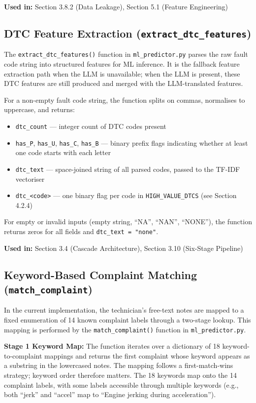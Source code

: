 \documentclass[10pt]{article}
\begin{document}
\textbf{Used in:} Section 3.8.2 (Data Leakage), Section 5.1 (Feature Engineering)

\subsection{DTC Feature Extraction (\texttt{extract\_dtc\_features})}

The \texttt{extract\_dtc\_features()} function in \texttt{ml\_predictor.py} parses the raw fault code string into structured features for ML inference. It is the fallback feature extraction path when the LLM is unavailable; when the LLM is present, these DTC features are still produced and merged with the LLM-translated features.

For a non-empty fault code string, the function splits on commas, normalises to uppercase, and returns:
\begin{itemize}
    \item \texttt{dtc\_count} --- integer count of DTC codes present
    \item \texttt{has\_P}, \texttt{has\_U}, \texttt{has\_C}, \texttt{has\_B} --- binary prefix flags indicating whether at least one code starts with each letter
    \item \texttt{dtc\_text} --- space-joined string of all parsed codes, passed to the TF-IDF vectoriser
    \item \texttt{dtc\_<code>} --- one binary flag per code in \texttt{HIGH\_VALUE\_DTCS} (see Section 4.2.4)
\end{itemize}

For empty or invalid inputs (empty string, ``NA'', ``NAN'', ``NONE''), the function returns zeros for all fields and \texttt{dtc\_text = "none"}.

\textbf{Used in:} Section 3.4 (Cascade Architecture), Section 3.10 (Six-Stage Pipeline)

\subsection{Keyword-Based Complaint Matching (\texttt{match\_complaint})}

In the current implementation, the technician's free-text notes are mapped to a fixed enumeration of 14 known complaint labels through a two-stage lookup. This mapping is performed by the \texttt{match\_complaint()} function in \texttt{ml\_predictor.py}.

\textbf{Stage 1 Keyword Map:} The function iterates over a dictionary of 18 keyword-to-complaint mappings and returns the first complaint whose keyword appears as a substring in the lowercased notes. The mapping follows a first-match-wins strategy; keyword order therefore matters. The 18 keywords map onto the 14 complaint labels, with some labels accessible through multiple keywords (e.g., both ``jerk'' and ``accel'' map to ``Engine jerking during acceleration'').
\end{document}
